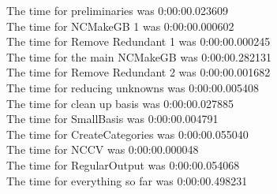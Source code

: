 \documentclass[rep10,leqno]{report}
\begin{document}
\noindent
The time for preliminaries was 0:00:00.023609\\
The time for NCMakeGB 1 was 0:00:00.000602\\
The time for Remove Redundant 1 was 0:00:00.000245\\
The time for the main NCMakeGB was 0:00:00.282131\\
The time for Remove Redundant 2 was 0:00:00.001682\\
The time for reducing unknowns was 0:00:00.005408\\
The time for clean up basis was 0:00:00.027885\\
The time for SmallBasis was 0:00:00.004791\\
The time for CreateCategories was 0:00:00.055040\\
The time for NCCV was 0:00:00.000048\\
The time for RegularOutput was 0:00:00.054068\\
The time for everything so far was 0:00:00.498231\\
\end{document}
